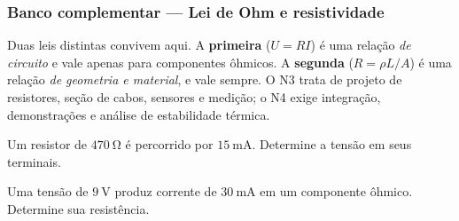 
\subsubsection*{Banco complementar --- Lei de Ohm e resistividade}

\begin{atencao}
Duas leis distintas convivem aqui. A \textbf{primeira} ($U=RI$) é uma relação
\emph{de circuito} e vale apenas para componentes ôhmicos. A \textbf{segunda}
($R=\rho L/A$) é uma relação \emph{de geometria e material}, e vale sempre. O N3
trata de projeto de resistores, seção de cabos, sensores e medição; o N4 exige
integração, demonstrações e análise de estabilidade térmica.
\end{atencao}

\blocofixacao

\begin{questao}[1]{}
Um resistor de $\SI{470}{\ohm}$ é percorrido por $\SI{15}{\milli\ampere}$.
Determine a tensão em seus terminais.
\end{questao}

\begin{questao}[1]{}
Uma tensão de $\SI{9}{\volt}$ produz corrente de
$\SI{30}{\milli\ampere}$ em um componente ôhmico. Determine sua resistência.
\end{questao}

